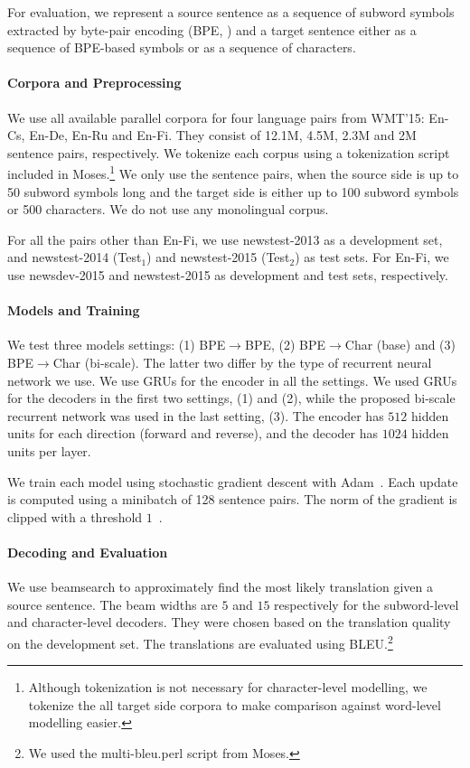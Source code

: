 \documentclass[11pt]{article}
\begin{document}
For evaluation, we represent a source sentence as a sequence of subword symbols
extracted by byte-pair encoding (BPE, ) and a target
sentence either as a sequence of BPE-based symbols or as a sequence of
characters. 

\paragraph{Corpora and Preprocessing}
We use all available parallel corpora for four language pairs from WMT'15:
En-Cs, En-De, En-Ru and En-Fi. They consist of 12.1M, 4.5M, 2.3M
and 2M sentence pairs, respectively. We tokenize each corpus using a tokenization
script included in Moses.\footnote{
    Although tokenization is not necessary for character-level modelling, we
    tokenize the all target side corpora to make comparison against word-level
    modelling easier. 
} 
We only use the sentence pairs, when the source side is up to 50 subword symbols
long and the target side is either up to 100 subword symbols or 500 characters.
We do not use any monolingual corpus.

For all the pairs other than En-Fi, we use newstest-2013 as a development
set, and newstest-2014 (Test$_1$) and newstest-2015 (Test$_2$) as test sets.
For En-Fi, we use newsdev-2015 and newstest-2015 as development and test sets,
respectively.

\paragraph{Models and Training}
We test three models settings: (1) BPE$\to$BPE, (2) BPE$\to$Char (base) and (3)
BPE$\to$Char (bi-scale). The latter two differ by the type of recurrent neural
network we use. 
We use GRUs for the encoder in all the settings. We used GRUs for the decoders in the
first two settings, (1) and (2), while the proposed bi-scale recurrent network was used in
the last setting, (3). The encoder has $512$ hidden units for each direction (forward
and reverse), and the decoder has $1024$ hidden units per layer. 

We train each model using stochastic gradient descent with 
Adam~\cite{kingma2014adam}. Each update is computed using a minibatch of 128
sentence pairs. The norm of the gradient is clipped with a threshold
$1$~\cite{pascanu2013construct}. 

\paragraph{Decoding and Evaluation}
We use beamsearch to approximately find the most likely translation given a
source sentence. The beam widths are $5$ and $15$ respectively for the
subword-level and character-level decoders. They were chosen based on the
translation quality on the development set. The translations are
evaluated using BLEU.\footnote{
    We used the multi-bleu.perl script from Moses.
}
\end{document}
